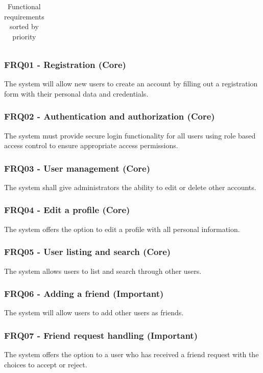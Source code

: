 \documentclass{ctuthesis}
\begin{document}
\begin{table}[ht!]
\begin{tabularx}{\textwidth}{|X|p{2.7cm}|l|}
\end{tabularx}
\caption{Functional requirements sorted by priority}
\label{table:frq}
\end{table}



\subsubsection{FRQ01 - Registration (Core)}
The system will allow new users to create an account by filling out a registration form with their personal data and credentials.

\subsubsection{FRQ02 - Authentication and authorization (Core)}
The system must provide secure login functionality for all users using role based access control to ensure appropriate access permissions.

\subsubsection{FRQ03 - User management (Core)}
The system shall give administrators the ability to edit or delete other accounts.

\subsubsection{FRQ04 - Edit a profile (Core)}
The system offers the option to edit a profile with all personal information.

\subsubsection{FRQ05 - User listing and search (Core)}
The system allows users to list and search through other users.

\subsubsection{FRQ06 - Adding a friend (Important)}
The system will allow users to add other users as friends.

\subsubsection{FRQ07 - Friend request handling (Important)}
The system offers the option to a user who has received a friend request with the choices to accept or reject.
\end{document}
